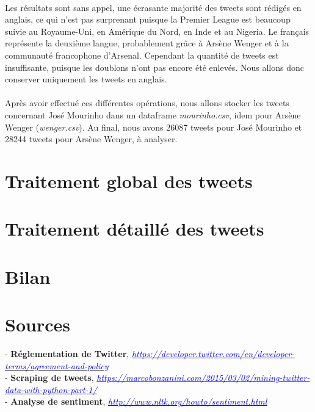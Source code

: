 \documentclass[14pt, openany]{article}
\begin{document}
\paragraph{}
Les résultats sont sans appel, une écrasante majorité des tweets sont rédigés en anglais, ce qui n'est pas surprenant puisque la Premier League est beaucoup suivie au Royaume-Uni, en Amérique du Nord, en Inde et au Nigeria. Le français représente la deuxième langue, probablement grâce à Arsène Wenger et à la communauté francophone d'Arsenal. Cependant la quantité de tweets est insuffisante, puisque les doublons n'ont pas encore été enlevés. Nous allons donc conserver uniquement les tweets en anglais.
\paragraph{}
Après avoir effectué ces différentes opérations, nous allons stocker les tweets concernant José Mourinho dans un dataframe \textit{mourinho.csv}, idem pour Arsène Wenger (\textit{wenger.csv}). Au final, nous avons 26087 tweets pour José Mourinho et 28244 tweets pour Arsène Wenger, à analyser.
\section{Traitement global des tweets}

\section{Traitement détaillé des tweets}

\section{Bilan}

\section{Sources}
\begin{flushleft}
- \textbf{Réglementation de Twitter}, \href{https://developer.twitter.com/en/developer-terms/agreement-and-policy}{\textit{\textcolor{blue}{https://developer.twitter.com/en/developer-terms/agreement-and-policy}}}\\
\medskip
- \textbf{Scraping de tweets}, \href{https://marcobonzanini.com/2015/03/02/mining-twitter-data-with-python-part-1/}{\textit{\textcolor{blue}{https://marcobonzanini.com/2015/03/02/mining-twitter-data-with-python-part-1/}}}\\
\medskip
- \textbf{Analyse de sentiment}, \href{http://www.nltk.org/howto/sentiment.html}{\textit{\textcolor{blue}{http://www.nltk.org/howto/sentiment.html}}}\\
\end{flushleft}
\end{document}
